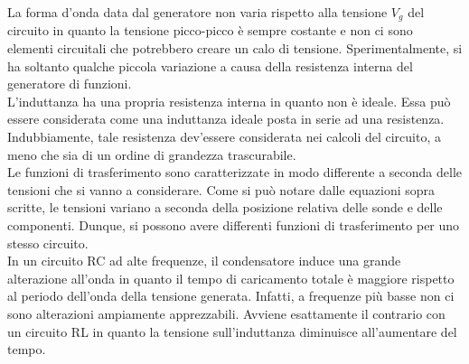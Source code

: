 \documentclass[a4paper]{article}
\begin{document}
La forma d'onda data dal generatore non varia rispetto alla tensione $V_g$ del circuito in quanto la tensione picco-picco è sempre costante e non ci sono elementi circuitali che potrebbero creare un calo di tensione. Sperimentalmente, si ha soltanto qualche piccola variazione a causa della resistenza interna del generatore di funzioni.\\
L'induttanza ha una propria resistenza interna in quanto non è ideale. Essa può essere considerata come una induttanza ideale posta in serie ad una resistenza. Indubbiamente, tale resistenza dev'essere considerata nei calcoli del circuito, a meno che sia di un ordine di grandezza trascurabile.\\
Le funzioni di trasferimento sono caratterizzate in modo differente a seconda delle tensioni che si vanno a considerare. Come si può notare dalle equazioni sopra scritte, le tensioni variano a seconda della posizione relativa delle sonde e delle componenti. Dunque, si possono avere differenti funzioni di trasferimento per uno stesso circuito.\\
In un circuito RC ad alte frequenze, il condensatore induce una grande alterazione all'onda in quanto il tempo di caricamento totale è maggiore rispetto al periodo dell'onda della tensione generata. Infatti, a frequenze più basse non ci sono alterazioni ampiamente apprezzabili. Avviene esattamente il contrario con un circuito RL in quanto la tensione sull'induttanza diminuisce all'aumentare del tempo.
\end{document}
